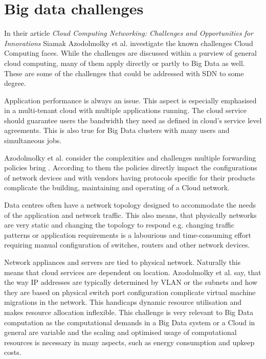\documentclass{acm_proc_article-sp}
\begin{document}
\section{Big data challenges}

In their article \textit{Cloud Computing Networking: Challenges and Opportunities for Innovations} \cite{Azodolmolky} Siamak Azodolmolky et al. investigate the known challenges Cloud Computing faces. While the challenges are discussed within a purview of general cloud computing, many of them apply directly or partly to Big Data as well. These are some of the challenges that could be addressed with SDN to some degree.

Application performance is always an issue. This aspect is especially emphasised in a multi-tenant cloud with multiple applications running. The cloud service should guarantee users the bandwidth they need as defined in cloud's service level agreements. This is also true for Big Data clusters with many users and simultaneous jobs.

Azodolmolky et al. consider the complexities and challenges multiple forwarding policies bring \cite{Azodolmolky}. According to them the policies directly impact the configurations of network devices and with vendors having protocols specific for their products complicate the building, maintaining and operating of a Cloud network.

Data centres often have a network topology designed to accommodate the needs of the application and network traffic. This also means, that physically networks are very static and changing the topology to respond e.g. changing traffic patterns or application requirements is a labourious and time-consuming effort requiring manual configuration of switches, routers and other network devices.

Network appliances and servers are tied to physical network. Naturally this means that cloud services are dependent on location. Azodolmolky et al. say, that the way IP addresses are typically determined by VLAN or the subnets and how they are based on physical switch port configuration complicate virtual machine migrations in the network. This handicaps dynamic resource utilisation and makes resource allocation inflexible. This challenge is very relevant to Big Data computation as the computational demands in a Big Data system or a Cloud in general are variable and the scaling and optimised usage of computational resources is necessary \cite{Frontiers} in many aspects, such as energy consumption and upkeep costs.
\end{document}
